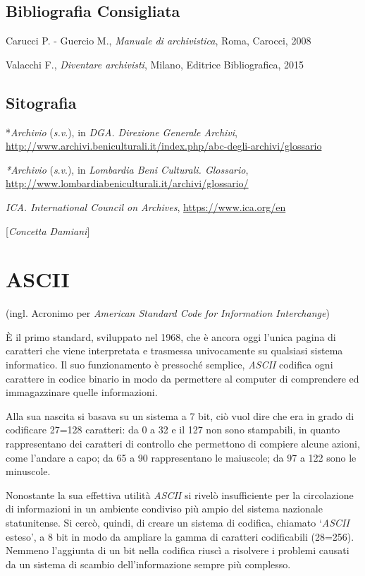 \section*{Bibliografia Consigliata}
{\parindent0pt 
Carucci P. - Guercio M., \emph{Manuale di archivistica}, Roma, Carocci,
2008

Valacchi F., \emph{Diventare archivisti}, Milano, Editrice
Bibliografica, 2015
}

\section*{Sitografia}
{\parindent0pt 
*\emph{Archivio} (\emph{s.v}.), in \emph{DGA. Direzione Generale
Archivi},
\url{http://www.archivi.beniculturali.it/index.php/abc-degli-archivi/glossario}

\emph{*Archivio} (\emph{s}.\emph{v}.), in \emph{Lombardia Beni
Culturali. Glossario},
\url{http://www.lombardiabeniculturali.it/archivi/glossario/}

\emph{ICA. International Council on Archives},
\url{https://www.ica.org/en}
}

\hrulefill 

{[}\emph{Concetta Damiani}{]}

\chapter{ASCII}

(ingl. Acronimo per \emph{American Standard Code for Information
Interchange})

È il primo standard, sviluppato nel 1968, che è ancora oggi l'unica
pagina di caratteri che viene interpretata e trasmessa univocamente su
qualsiasi sistema informatico. Il suo funzionamento è pressoché
semplice, \emph{ASCII} codifica ogni carattere in codice binario in modo
da permettere al computer di comprendere ed immagazzinare quelle
informazioni.

Alla sua nascita si basava su un sistema a 7 bit, ciò vuol dire che era
in grado di codificare 27=128 caratteri: da 0 a 32 e il 127 non sono
stampabili, in quanto rappresentano dei caratteri di controllo che
permettono di compiere alcune azioni, come l'andare a capo; da 65 a 90
rappresentano le maiuscole; da 97 a 122 sono le minuscole.~

Nonostante la sua effettiva utilità \emph{ASCII} si rivelò insufficiente
per la circolazione di informazioni in un ambiente condiviso più ampio
del sistema nazionale statunitense. Si cercò, quindi, di creare un
sistema di codifica, chiamato `\emph{ASCII} esteso', a 8 bit in modo da
ampliare la gamma di caratteri codificabili (28=256). Nemmeno l'aggiunta
di un bit nella codifica riuscì a risolvere i problemi causati da un
sistema di scambio dell'informazione sempre più complesso.

